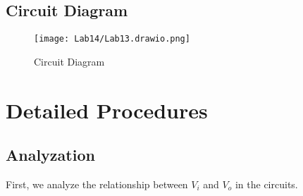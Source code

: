     \subsection{Circuit Diagram}
        \begin{figure}[h]
            \centering
            \texttt{[image: Lab14/Lab13.drawio.png]}
            \caption{Circuit Diagram}
            \label{l13f}
        \end{figure}
        \FloatBarrier

\section{Detailed Procedures}
    \subsection{Analyzation}
    First, we analyze the relationship between $V_i$ and $V_o$ in the circuits.\par
